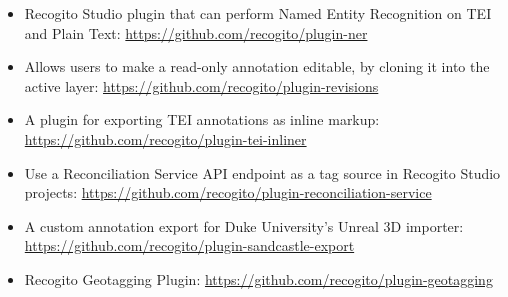 \documentclass[final]{anthology-ch}         %
\begin{document}
\begin{itemize}
  \item Recogito Studio plugin that can perform Named Entity Recognition on TEI and Plain Text: \url{https://github.com/recogito/plugin-ner}
  \item Allows users to make a read-only annotation editable, by cloning it into the active layer: \url{https://github.com/recogito/plugin-revisions}
  \item A plugin for exporting TEI annotations as inline markup: \url{https://github.com/recogito/plugin-tei-inliner}
  \item Use a Reconciliation Service API endpoint as a tag source in Recogito Studio projects: \url{https://github.com/recogito/plugin-reconciliation-service}
  \item A custom annotation export for Duke University's Unreal 3D importer: \url{https://github.com/recogito/plugin-sandcastle-export}
  \item Recogito Geotagging Plugin: \url{https://github.com/recogito/plugin-geotagging}
\end{itemize}
\end{document}
